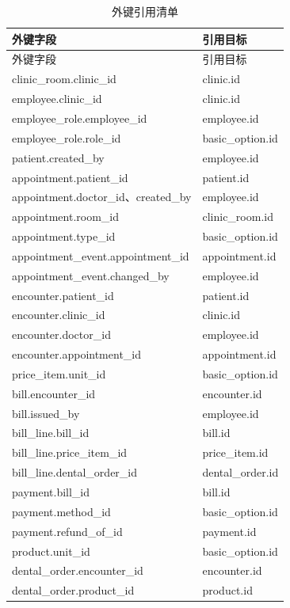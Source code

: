 \begingroup\linespread{1}\fontsize{10.5}{13}\selectfont\renewcommand{\arraystretch}{1.05}
\begin{longtable}{L{8.0cm}L{6.5cm}}
\caption{外键引用清单}\label{tab:foreign-keys}\\
\toprule 外键字段 & 引用目标\\\midrule\endfirsthead
\toprule 外键字段 & 引用目标\\\midrule\endhead
clinic\_room.clinic\_id & clinic.id\\
employee.clinic\_id & clinic.id\\
employee\_role.employee\_id & employee.id\\
employee\_role.role\_id & basic\_option.id\\
patient.created\_by & employee.id\\
appointment.patient\_id & patient.id\\
appointment.doctor\_id、created\_by & employee.id\\
appointment.room\_id & clinic\_room.id\\
appointment.type\_id & basic\_option.id\\
appointment\_event.appointment\_id & appointment.id\\
appointment\_event.changed\_by & employee.id\\
encounter.patient\_id & patient.id\\
encounter.clinic\_id & clinic.id\\
encounter.doctor\_id & employee.id\\
encounter.appointment\_id & appointment.id\\
price\_item.unit\_id & basic\_option.id\\
bill.encounter\_id & encounter.id\\
bill.issued\_by & employee.id\\
bill\_line.bill\_id & bill.id\\
bill\_line.price\_item\_id & price\_item.id\\
bill\_line.dental\_order\_id & dental\_order.id\\
payment.bill\_id & bill.id\\
payment.method\_id & basic\_option.id\\
payment.refund\_of\_id & payment.id\\
product.unit\_id & basic\_option.id\\
dental\_order.encounter\_id & encounter.id\\
dental\_order.product\_id & product.id\\

\end{longtable}
